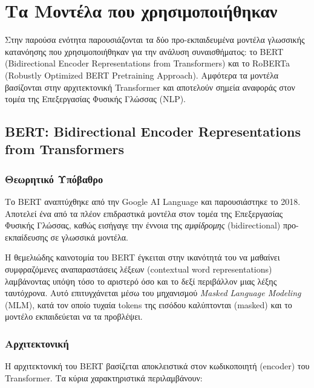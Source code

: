 \documentclass[a4paper,11pt,oneside,openany]{ioniothesis}
\begin{document}
\section{Τα Μοντέλα που χρησιμοποιήθηκαν}
\label{sec:Τα Μοντέλα που χρησιμοποιήθηκαν}

Στην παρούσα ενότητα παρουσιάζονται τα δύο προ-εκπαιδευμένα μοντέλα γλωσσικής κατανόησης που χρησιμοποιήθηκαν για την ανάλυση συναισθήματος: το BERT (Bidirectional Encoder Representations from Transformers) και το RoBERTa (Robustly Optimized BERT Pretraining Approach). Αμφότερα τα μοντέλα βασίζονται στην αρχιτεκτονική Transformer και αποτελούν σημεία αναφοράς στον τομέα της Επεξεργασίας Φυσικής Γλώσσας (NLP).

\subsection{BERT: Bidirectional Encoder Representations from Transformers}
\label{sec:BERT GoEmotions}

\subsubsection{Θεωρητικό Υπόβαθρο}
\label{sec:Θεωρητικό Υπόβαθρο BERT}

Το BERT αναπτύχθηκε από την Google AI Language και παρουσιάστηκε το 2018. Αποτελεί ένα από τα πλέον επιδραστικά μοντέλα στον τομέα της Επεξεργασίας Φυσικής Γλώσσας, καθώς εισήγαγε την έννοια της \textit{αμφίδρομης} (bidirectional) προ-εκπαίδευσης σε γλωσσικά μοντέλα.

Η θεμελιώδης καινοτομία του BERT έγκειται στην ικανότητά του να μαθαίνει συμφραζόμενες αναπαραστάσεις λέξεων (contextual word representations) λαμβάνοντας υπόψη τόσο το αριστερό όσο και το δεξί περιβάλλον μιας λέξης ταυτόχρονα. Αυτό επιτυγχάνεται μέσω του μηχανισμού \textit{Masked Language Modeling} (MLM), κατά τον οποίο τυχαία tokens της εισόδου καλύπτονται (masked) και το μοντέλο εκπαιδεύεται να τα προβλέψει.

\subsubsection{Αρχιτεκτονική}
\label{sec:Αρχιτεκτονική BERT}

Η αρχιτεκτονική του BERT βασίζεται αποκλειστικά στον κωδικοποιητή (encoder) του Transformer. Τα κύρια χαρακτηριστικά περιλαμβάνουν:
\end{document}
